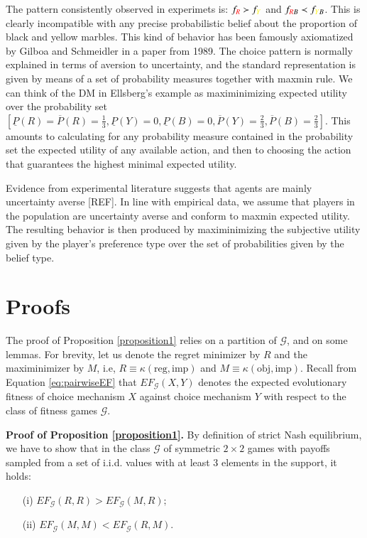 \documentclass[fleqn,reqno,11pt]{article}
\begin{document}
The pattern consistently observed in experimets is:
$f_{{\color{red}R}} \succ f_{{\color{yellow}Y}}$ and
$f_{{\color{red}R}B} \prec f_{{\color{yellow}Y}B}$. This is clearly incompatible with any
precise probabilistic belief about the proportion of black and yellow marbles. This kind of
behavior has been famously axiomatized by Gilboa and Schmeidler in a paper from 1989. The
choice pattern is normally explained in terms of aversion to uncertainty, and the standard
representation is given by means of a set of probability measures together with maxmin rule. We
can think of the DM in Ellsberg's example as maximinimizing expected utility over the
probability set
$
[\underline{P}(R)=\overline{P}(R)=\frac{1}{3},\underline{P}(Y)=0,\underline{P}(B)=0,\overline{P}(Y)=\frac{2}{3},\overline{P}(B)=\frac{2}{3}]
$.
This amounts to calculating for any probability measure contained in the probability set the
expected utility of any available action, and then to choosing the action that guarantees the
highest minimal expected utility. 

Evidence from experimental literature suggests that agents are mainly uncertainty averse
[REF]. In line with empirical data, we assume that players in the population are uncertainty
averse and conform to maxmin expected utility. The resulting behavior is then produced by
maximinimizing the subjective utility given by the player's preference type over the set of
probabilities given by the belief type.


\section{Proofs}
\label{sec:proofs}


The proof of Proposition \ref{proposition1} relies on a partition of $\mathcal{G}$,
and on some lemmas. For brevity, let us denote the regret minimizer
by $R$ and the maximinimizer by $M$, i.e, $R \equiv \kappa(\text{reg}, \text{imp})$ and $M \equiv  \kappa(\text{obj}, \text{imp})$. Recall from Equation \ref{eq:pairwiseEF} that $EF_{\mathcal{G}}(X,Y)$ denotes the expected evolutionary fitness of choice mechanism $X$ against choice mechanism $Y$
with respect to the class of fitness games $\mathcal{G}$.

\vspace{.5cm}


\noindent \textbf{Proof of Proposition \ref{proposition1}.} By definition of strict Nash equilibrium, we have to
show that in the class $\mathcal{G}$ of symmetric $2\times2$ games with payoffs sampled from a set of i.i.d. values with at least 3 elements in the support, it holds:
\begin{itemize}
\item[(i)] $EF_{\mathcal{G}}(R,R)>EF_{\mathcal{G}}(M,R);$
\item[(ii)] $EF_{\mathcal{G}}(M,M)<EF_{\mathcal{G}}(R,M).$
\end{itemize}
\end{document}
